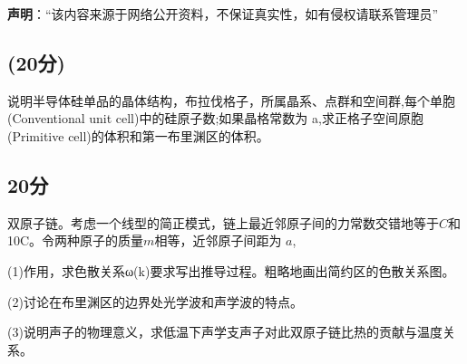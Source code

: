 
\textbf{声明}：“该内容来源于网络公开资料，不保证真实性，如有侵权请联系管理员”


\subsection{(20分)}
说明半导体硅单品的晶体结构，布拉伐格子，所属晶系、点群和空间群,每个单胞(Conventional unit cell)中的硅原子数;如果晶格常数为 a,求正格子空间原胞(Primitive cell)的体积和第一布里渊区的体积。
\subsection{20分}
双原子链。考虑一个线型的简正模式，链上最近邻原子间的力常数交错地等于$C$和 10C。令两种原子的质量$m$相等，近邻原子间距为 $a$,

(1)作用，求色散关系ω(k)要求写出推导过程。粗略地画出简约区的色散关系图。

(2)讨论在布里渊区的边界处光学波和声学波的特点。

(3)说明声子的物理意义，求低温下声学支声子对此双原子链比热的贡献与温度关系。